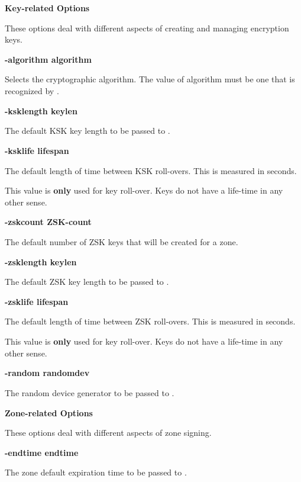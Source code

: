 {\bf Key-related Options}

These options deal with different aspects of creating and managing
encryption keys.

\begin{description}

\item {\bf -algorithm algorithm}\verb" "

Selects the cryptographic algorithm. The value of algorithm must be one that
is recognized by .

\item {\bf -ksklength keylen}\verb" "

The default KSK key length to be passed to .

\item {\bf -ksklife lifespan}\verb" "

The default length of time between KSK roll-overs.  This is measured in   
seconds.

This value is {\bf only} used for key roll-over.  Keys do not have a life-time
in any other sense.

\item {\bf -zskcount ZSK-count}\verb" "

The default number of ZSK keys that will be created for a zone.

\item {\bf -zsklength keylen}\verb" "

The default ZSK key length to be passed to .

\item {\bf -zsklife lifespan}\verb" "

The default length of time between ZSK roll-overs.  This is measured in   
seconds.

This value is {\bf only} used for key roll-over.  Keys do not have a life-time
in any other sense.

\item {\bf -random randomdev}\verb" "

The random device generator to be passed to .

\end{description}

{\bf Zone-related Options}

These options deal with different aspects of zone signing.

\begin{description}

\item {\bf -endtime endtime}\verb" "

The zone default expiration time to be passed to .

\end{description}

